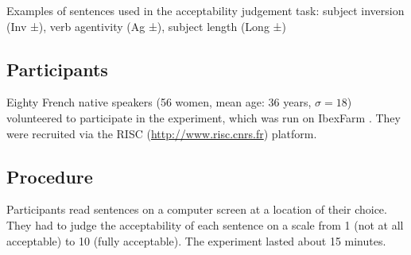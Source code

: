 \documentclass[output=paper]{langscibook}
\begin{document}
\begin{sidewaystable}

 \caption{Examples of sentences used in the acceptability judgement
   task:  subject inversion (Inv ±), verb agentivity (Ag ±), subject length (Long ±) 
   \label{tab:4:annotation}}
\end{sidewaystable}


\subsection{Participants}
Eighty French native speakers (56 women, mean age: 36 years, $\sigma=18$) volunteered to participate in the experiment, which was run on IbexFarm \citep{drummond2013ibex}. They were recruited via the RISC (\url{http://www.risc.cnrs.fr}) platform. 

\subsection{Procedure}
Participants read sentences on a computer screen at a location of their choice. They had to judge the acceptability of each sentence on a scale from 1 (not at all acceptable) to 10 (fully acceptable). The experiment lasted about 15 minutes.
\end{document}
